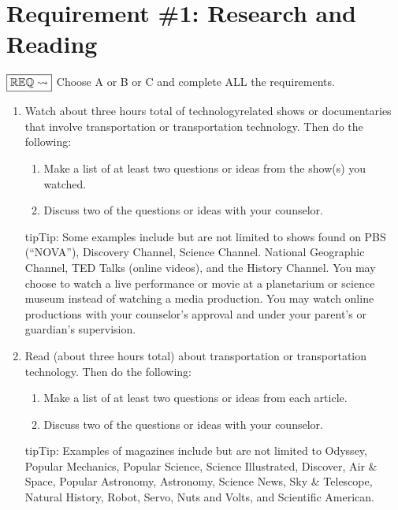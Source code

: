 \documentclass[letterpaper,10pt,english,openany,oneside]{sphinxmanual}
\begin{document}
\chapter{Requirement \#1: Research and Reading}
\label{\detokenize{requirement1:requirement-1-research-and-reading}}\label{\detokenize{requirement1::doc}}
\(\boxed{\mathbb{REQ}\Large \rightsquigarrow}\) Choose A or B or C and complete ALL the requirements.
\begin{enumerate}
%
\item {} 
Watch about three hours total of technology\sphinxhyphen{}related shows or documentaries that involve transportation or transportation technology. Then do the following:
\begin{enumerate}
%
\item {} 
Make a list of at least two questions or ideas from the show(s) you watched.

\item {} 
Discuss two of the questions or ideas with your counselor.

\end{enumerate}

\begin{sphinxadmonition}{tip}{Tip:}
Some examples include \sphinxhyphen{} but are not limited to \sphinxhyphen{} shows found on PBS (“NOVA”), Discovery Channel, Science Channel. National Geographic Channel, TED Talks (online videos), and the History Channel. You may choose to watch a live performance or movie at a planetarium or science museum instead of watching a media production. You may watch online productions with your counselor’s approval and under your parent’s or guardian’s supervision.
\end{sphinxadmonition}

\item {} 
Read (about three hours total) about transportation or transportation technology. Then do the following:
\begin{enumerate}
%
\item {} 
Make a list of at least two questions or ideas from each article.

\item {} 
Discuss two of the questions or ideas with your counselor.

\end{enumerate}

\begin{sphinxadmonition}{tip}{Tip:}
Examples of magazines include \sphinxhyphen{} but are not limited to \sphinxhyphen{} Odyssey, Popular Mechanics, Popular Science, Science Illustrated, Discover, Air \& Space, Popular Astronomy, Astronomy, Science News, Sky \& Telescope, Natural History, Robot, Servo, Nuts and Volts, and Scientific American.
\end{sphinxadmonition}


\end{enumerate}
\end{document}

